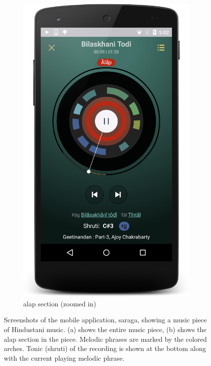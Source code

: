 \begin{figure}
\begin{subfigure}[b]{0.48\textwidth}
		\includegraphics[width=\figSizeNinety]{ch08_applications/figures/saraga2.png}
		\caption{\Gls{alap} section (zoomed in)}
		\label{fig:saraga_alap_section}
	\end{subfigure}
	\caption[Screenshots of the mobile application, \gls{saraga}]{Screenshots of the mobile application, \gls{saraga}, showing a music piece of Hindustani music. (a) shows the entire music piece, (b) shows the \gls{alap} section in the piece. Melodic phrases are marked by the colored arches. Tonic (\gls{shruti}) of the recording is shown at the bottom along with the current playing melodic phrase.}
	\label{fig:saraga_screens}
\end{figure}

